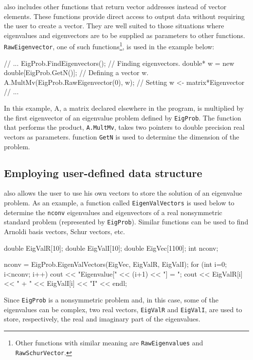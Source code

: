 \ARPP{} also includes other functions that return vector addresses instead of vector elements. These functions provide direct access to output data without requiring the user to create a vector. They are well suited to those situations where eigenvalues and eigenvectors are to be supplied as parameters to other functions. \texttt{RawEigenvector}, one of such functions\footnote{Other functions with similar meaning are \texttt{RawEigenvalues} and \texttt{RawSchurVector}.}, is used in the example below:

\begin{cppcode}
// ...
EigProb.FindEigenvectors();             // Finding eigenvectors.
double* w = new double[EigProb.GetN()]; // Defining a vector w.
A.MultMv(EigProb.RawEigenvector(0), w); // Setting w <- matrix*Eigenvector
// ...
\end{cppcode}

In this example, A, a matrix declared elsewhere in the program, is multiplied by the first eigenvector of an eigenvalue problem defined by \texttt{EigProb}. The function that performs the product, \texttt{A.MultMv}, takes two pointers to double precision real vectors as parameters. \ARPP{} function \texttt{GetN} is used to determine the dimension of the problem.

\subsection{Employing user-defined data structure}

\ARPP{} also allows the user to use his own vectors to store the solution of an eigenvalue problem. As an example, a function called \texttt{EigenValVectors} is used below to determine the \texttt{nconv} eigenvalues and eigenvectors of a real nonsymmetric standard problem (represented by \texttt{EigProb}). Similar functions can be used to find Arnoldi basis vectors, Schur vectors, etc.

\begin{cppcode}
double EigValR[10];
double EigValI[10];
double EigVec[1100];
int    nconv;

nconv = EigProb.EigenValVectors(EigVec, EigValR, EigValI);
for (int i=0; i<nconv; i++) {
	cout << "Eigenvalue[" << (i+1) << "] = ";
	cout << EigValR[i] << " + " << EigValI[i] << "I" << endl;
}
\end{cppcode}

Since \texttt{EigProb} is a nonsymmetric problem and, in this case, some of the eigenvalues can be complex, two real vectors, \texttt{EigValR} and \texttt{EigValI}, are used to store, respectively, the real and imaginary part of the eigenvalues.

